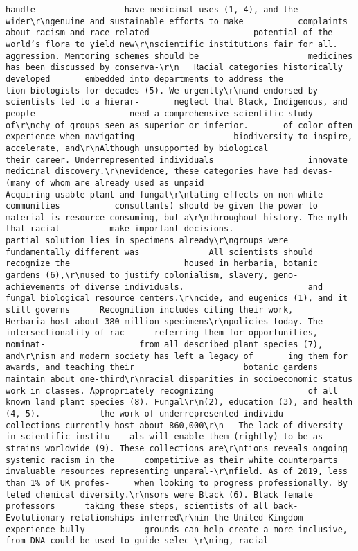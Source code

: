 \documentclass[
]{book}
\begin{document}
\begin{verbatim}
handle                  have medicinal uses (1, 4), and the wider\r\ngenuine and sustainable efforts to make           complaints about racism and race-related                     potential of the world’s flora to yield new\r\nscientific institutions fair for all.             aggression. Mentoring schemes should be                      medicines has been discussed by conserva-\r\n   Racial categories historically developed       embedded into departments to address the                     tion biologists for decades (5). We urgently\r\nand endorsed by scientists led to a hierar-       neglect that Black, Indigenous, and people                   need a comprehensive scientific study of\r\nchy of groups seen as superior or inferior.       of color often experience when navigating                    biodiversity to inspire, accelerate, and\r\nAlthough unsupported by biological                their career. Underrepresented individuals                   innovate medicinal discovery.\r\nevidence, these categories have had devas-        (many of whom are already used as unpaid                        Acquiring usable plant and fungal\r\ntating effects on non-white communities           consultants) should be given the power to                    material is resource-consuming, but a\r\nthroughout history. The myth that racial          make important decisions.                                    partial solution lies in specimens already\r\ngroups were fundamentally different was              All scientists should recognize the                       housed in herbaria, botanic gardens (6),\r\nused to justify colonialism, slavery, geno-       achievements of diverse individuals.                         and fungal biological resource centers.\r\ncide, and eugenics (1), and it still governs      Recognition includes citing their work,                      Herbaria host about 380 million specimens\r\npolicies today. The intersectionality of rac-     referring them for opportunities, nominat-                   from all described plant species (7), and\r\nism and modern society has left a legacy of       ing them for awards, and teaching their                      botanic gardens maintain about one-third\r\nracial disparities in socioeconomic status        work in classes. Appropriately recognizing                   of all known land plant species (8). Fungal\r\n(2), education (3), and health (4, 5).            the work of underrepresented individu-                       collections currently host about 860,000\r\n   The lack of diversity in scientific institu-   als will enable them (rightly) to be as                      strains worldwide (9). These collections are\r\ntions reveals ongoing systemic racism in the      competitive as their white counterparts                      invaluable resources representing unparal-\r\nfield. As of 2019, less than 1% of UK profes-     when looking to progress professionally. By                  leled chemical diversity.\r\nsors were Black (6). Black female professors      taking these steps, scientists of all back-                     Evolutionary relationships inferred\r\nin the United Kingdom experience bully-           grounds can help create a more inclusive,                    from DNA could be used to guide selec-\r\ning, racial 
\end{verbatim}
\end{document}
